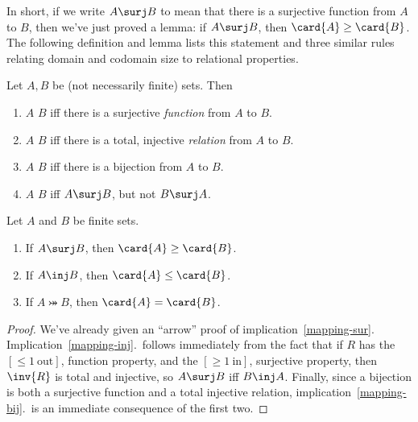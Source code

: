 In short, if we write $A \surj B$ to mean that there is a surjective
function from $A$ to $B$, then we've just proved a lemma: if $A \surj B$,
then $\card{A} \geq \card{B}$.  The following definition and lemma lists
this statement and three similar rules relating domain and codomain size
to relational properties.

\begin{definition}\label{bigger}
  Let $A,B$ be (not necessarily finite) sets.  Then
  \begin{enumerate}
  \item $A$ \term{$\surj$} $B$ iff there is a surjective \emph{function} from $A$ to $B$.  

  \item $A$ \term{$\inj$} $B$ iff there is a total, injective \emph{relation} from $A$ to $B$.

  \item $A$ \term{$\bij$} $B$ iff there is a bijection from $A$ to $B$.  

  \item $A$ \term{$\strict$} $B$ iff $A \surj B$, but not $B \surj A$.

  \end{enumerate}
\end{definition}

\begin{lemma}\label{maprule_implies}
Let $A$ and $B$ be finite sets.

\begin{enumerate}

\item\label{mapping-sur} If $A \surj B$, then $\card{A} \geq \card{B}$.

\item\label{mapping-inj} If $A \inj B$, then $\card{A} \leq \card{B}$.

\item\label{mapping-bij} If $A \bij B$, then $\card{A} = \card{B}$.
\end{enumerate}

\end{lemma}

\begin{proof}
  We've already given an ``arrow'' proof of implication~\ref{mapping-sur}.
  Implication~\ref{mapping-inj}.\ follows immediately from the fact
  that if $R$ has the $[\le 1\ \text{out}]$, function property, and
  the $[\ge 1\ \text{in}]$, surjective property, then $\inv{R}$ is
  total and injective, so $A \surj B$ iff $B \inj A$.  Finally, since
  a bijection is both a surjective function and a total injective
  relation, implication~\ref{mapping-bij}.\ is an immediate
  consequence of the first two.
\end{proof}

